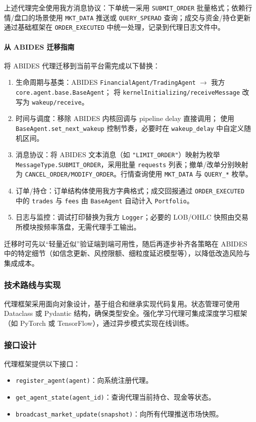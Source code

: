 上述代理完全使用我方消息协议：下单统一采用 \verb|SUBMIT_ORDER| 批量格式；依赖行情/盘口的场景使用 \verb|MKT_DATA| 推送或 \verb|QUERY_SPERAD| 查询；成交与资金/持仓更新通过基础框架在 \verb|ORDER_EXECUTED| 中统一处理，记录到代理日志文件中。

\paragraph{从 ABIDES 迁移指南}
将 ABIDES 代理迁移到当前平台需完成以下替换：
\begin{enumerate}
  \item 生命周期与基类：ABIDES \verb|FinancialAgent/TradingAgent| $\rightarrow$ 我方 \verb|core.agent.base.BaseAgent|；
  将 \verb|kernelInitializing/receiveMessage| 改写为 \verb|wakeup/receive|。
  \item 时间与调度：移除 ABIDES 内核回调与 pipeline delay 直接调用；
  使用 \verb|BaseAgent.set_next_wakeup| 控制节奏，必要时在 \verb|wakeup_delay| 中自定义随机区间。
  \item 消息协议：将 ABIDES 文本消息（如 \verb|"LIMIT_ORDER"|）映射为枚举 \verb|MessageType.SUBMIT_ORDER|，采用批量 \verb|requests| 列表；撤单/改单分别映射为 \verb|CANCEL_ORDER/MODIFY_ORDER|。行情查询使用 \verb|MKT_DATA| 与 \verb|QUERY_*| 枚举。
  \item 订单/持仓：订单结构体使用我方字典格式；成交回报通过 \verb|ORDER_EXECUTED| 中的 \verb|trades| 与 \verb|fees| 由 \verb|BaseAgent| 自动计入 \verb|Portfolio|。
  \item 日志与监控：调试打印替换为我方 \verb|Logger|；必要的 LOB/OHLC 快照由交易所模块按频率落盘，无需代理手工输出。
\end{enumerate}

迁移时可先以“轻量近似”验证端到端可用性，随后再逐步补齐各策略在 ABIDES 中的特定细节（如信念更新、风控限额、细粒度延迟模型等），以降低改造风险与集成成本。

\subsubsection{技术路线与实现}
代理框架采用面向对象设计，基于组合和继承实现代码复用。状态管理可使用 Dataclass 或 Pydantic 结构，确保类型安全。强化学习代理可集成深度学习框架（如 PyTorch 或 TensorFlow），通过异步模式实现在线训练。

\subsubsection{接口设计}
代理框架提供以下接口：
\begin{itemize}
  \item \verb|register_agent(agent)|：向系统注册代理。
  \item \verb|get_agent_state(agent_id)|：查询代理当前持仓、现金等状态。
  \item \verb|broadcast_market_update(snapshot)|：向所有代理推送市场快照。
\end{itemize}

